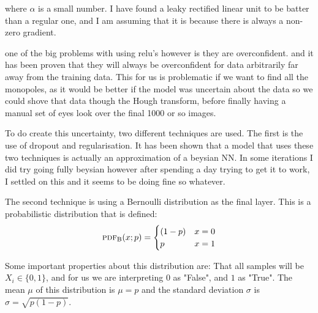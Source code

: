 \documentclass[10pt, a4paper]{article}
\begin{document}
where $\alpha$ is a small number. I have found a leaky rectified linear unit to be batter than a regular one, and I am assuming that it is because there is always a non-zero gradient. 

one of the big problems with using relu's however is they are overconfident. and it has been proven that they will always be overconfident for data arbitrarily far away from the training data. This for us is problematic if we want to find all the monopoles, as it would be better if the model was uncertain about the data so we could shove that data though the Hough transform, before finally having a manual set of eyes look over the final 1000 or so images. 

To do create this uncertainty, two different techniques are used. The first is the use of dropout and regularisation. It has been shown that a model that uses these two techniques is actually an approximation of a beysian NN. In some iterations I did try going fully beysian however after spending a day trying to get it to work, I settled on this and it seems to be doing fine so whatever.

The second technique is using a Bernoulli distribution as the final layer. This is a probabilistic distribution that is defined:
\begin{equation}
 \text{\textsc{pdf}}_\text{B}(x; p) =  \begin{cases} (1-p) & x = 0 \\ p & x = 1 \end{cases}
\end{equation}

Some important properties about this distribution are: That all samples will be $X_i \in \{0, 1\}$, and for us we are interpreting $0$ as "False", and $1$ as "True". The mean $\mu$ of this distribution is $\mu = p$ and the standard deviation $\sigma$ is $\sigma = \sqrt{p(1-p)}$. 
\end{document}
